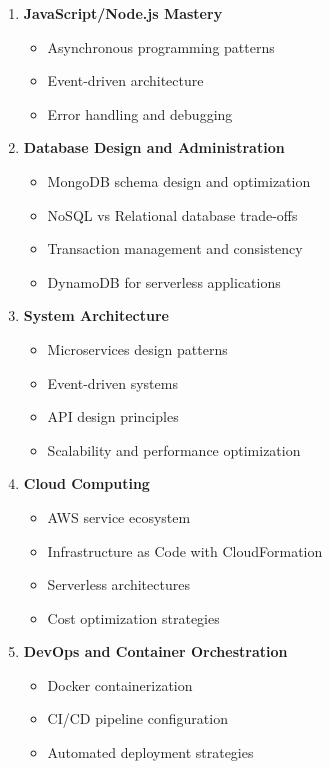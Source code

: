 \begin{enumerate}
    \item \textbf{JavaScript/Node.js Mastery}
    \begin{itemize}
        \item Asynchronous programming patterns
        \item Event-driven architecture
        \item Error handling and debugging
    \end{itemize}
    
    \item \textbf{Database Design and Administration}
    \begin{itemize}
        \item MongoDB schema design and optimization
        \item NoSQL vs Relational database trade-offs
        \item Transaction management and consistency
        \item DynamoDB for serverless applications
    \end{itemize}
    
    \item \textbf{System Architecture}
    \begin{itemize}
        \item Microservices design patterns
        \item Event-driven systems
        \item API design principles
        \item Scalability and performance optimization
    \end{itemize}
    
    \item \textbf{Cloud Computing}
    \begin{itemize}
        \item AWS service ecosystem
        \item Infrastructure as Code with CloudFormation
        \item Serverless architectures
        \item Cost optimization strategies
    \end{itemize}
    
    \item \textbf{DevOps and Container Orchestration}
    \begin{itemize}
        \item Docker containerization
        \item CI/CD pipeline configuration
        \item Automated deployment strategies
    \end{itemize}
\end{enumerate}

